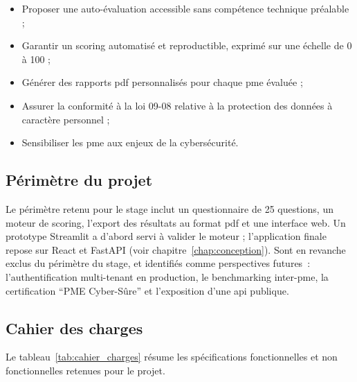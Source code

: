\begin{itemize}
  \item Proposer une auto-évaluation accessible sans compétence technique préalable ;
  \item Garantir un scoring automatisé et reproductible, exprimé sur une échelle de 0 à 100 ;
  \item Générer des rapports \gls{pdf} personnalisés pour chaque \gls{pme} évaluée ;
  \item Assurer la conformité à la loi 09-08 relative à la protection des données à caractère personnel ;
  \item Sensibiliser les \gls{pme} aux enjeux de la cybersécurité.
\end{itemize}

\subsection{Périmètre du projet}

Le périmètre retenu pour le stage inclut un questionnaire de 25 questions, un moteur de scoring, l'export des résultats au format \gls{pdf} et une interface web. Un prototype Streamlit a d'abord servi à valider le moteur ; l'application finale repose sur React et FastAPI (voir chapitre~\ref{chap:conception}). Sont en revanche exclus du périmètre du stage, et identifiés comme perspectives futures~: l'authentification multi-tenant en production, le benchmarking inter-\gls{pme}, la certification \enquote{PME Cyber-Sûre} et l'exposition d'une \gls{api} publique.

\subsection{Cahier des charges}

Le tableau~\ref{tab:cahier_charges} résume les spécifications fonctionnelles et non fonctionnelles retenues pour le projet.

